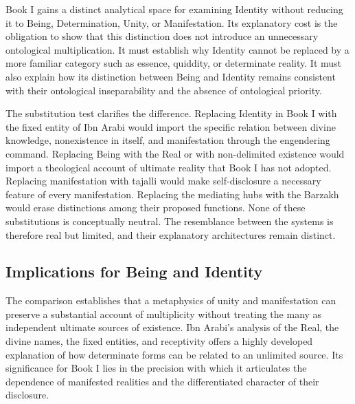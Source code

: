 \label{para:VS.B01.P01.C08.S16.SS16.P002}

Book I gains a distinct analytical space
for examining Identity without reducing
it to Being, Determination, Unity, or
Manifestation. Its explanatory cost is
the obligation to show that this distinction
does not introduce an unnecessary ontological
multiplication. It must establish why
Identity cannot be replaced by a more
familiar category such as essence, quiddity,
or determinate reality. It must also explain
how its distinction between Being and Identity
remains consistent with their ontological
inseparability and the absence of ontological
priority.

\label{para:VS.B01.P01.C08.SS16.P003}

The substitution test clarifies the difference.
Replacing Identity in Book I with the fixed
entity of Ibn Arabi would import the specific
relation between divine knowledge, nonexistence
in itself, and manifestation through the
engendering command. Replacing Being with
the Real or with non-delimited existence
would import a theological account of
ultimate reality that Book I has not adopted.
Replacing manifestation with tajalli would
make self-disclosure a necessary feature
of every manifestation. Replacing the
mediating hubs with the Barzakh would
erase distinctions among their proposed
functions. None of these substitutions
is conceptually neutral. The resemblance
between the systems is therefore real
but limited, and their explanatory
architectures remain distinct.



\subsection{Implications for Being and Identity}
\label{subsec:ch08_s16_ss17}

\label{para:VS.B01.P01.C08.S16.SS17.P001}

The comparison establishes that a metaphysics
of unity and manifestation can preserve
a substantial account of multiplicity
without treating the many as independent
ultimate sources of existence. Ibn Arabi's
analysis of the Real, the divine names,
the fixed entities, and receptivity offers
a highly developed explanation of how
determinate forms can be related to an
unlimited source. Its significance for
Book I lies in the precision with which
it articulates the dependence of manifested
realities and the differentiated character
of their disclosure.

